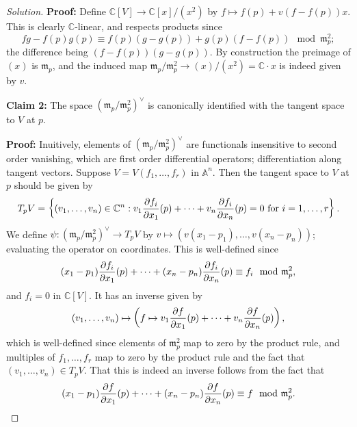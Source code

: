 \documentclass{article}
\theoremstyle{definition}
\newcommand{\m}{\mathfrak{m}}
\newcommand{\A}{\mathbb{A}}
\newcommand{\C}{\mathbb{C}}
\begin{document}
\begin{enumerate}
\begin{proof}[Solution]
            \textbf{Proof:}
            Define $\C[V]\to\C[x]/(x^2)$ by $f\mapsto f(p)+v(f-f(p))x$. This is
            clearly $\C$-linear, and respects products since
            \begin{equation*}
                fg-f(p)g(p) \equiv f(p)(g-g(p)) + g(p)(f-f(p)) \mod \m_p^2;
            \end{equation*}
            the difference being $(f-f(p))(g-g(p))$. By construction the
            preimage of $(x)$ is $\m_p$, and the induced map
            $\m_p/\m_p^2\to(x)/(x^2)=\C\cdot x$ is indeed given by $v$.

            \textbf{Claim 2:}
            The space $(\m_p/\m_p^2)^\vee$ is canonically identified with the
            tangent space to $V$ at $p$.

            \textbf{Proof:}
            Inuitively, elements of $(\m_p/\m_p^2)^\vee$ are functionals
            insensitive to second order vanishing, which are first order
            differential operators; differentiation along tangent vectors.
            Suppose $V=V(f_1,\ldots,f_r)$ in $\A^n$. Then the tangent space to
            $V$ at $p$ should be given by
            \begin{equation*}
                T_pV = \left\{(v_1,\ldots,v_n)\in\C^n
                    : v_1\pdv{f_i}{x_1}(p)+\cdots+v_n\pdv{f_i}{x_n}(p)=0
                    \text{ for $i=1,\ldots,r$}\right\}.
            \end{equation*}
            We define $\psi:(\m_p/\m_p^2)^\vee\to T_pV$ by
            $v\mapsto(v(x_1-p_1),\ldots,v(x_n-p_n))$; evaluating the operator on
            coordinates. This is well-defined since
            \begin{equation*}
                (x_1-p_1)\pdv{f_i}{x_1}(p) + \cdots + (x_n-p_n)\pdv{f_i}{x_n}(p)
                    \equiv f_i \mod \m_p^2,
            \end{equation*}
            and $f_i=0$ in $\C[V]$. It has an inverse given by
            \begin{equation*}
                (v_1,\ldots,v_n) \mapsto
                    \left(f\mapsto v_1\pdv{f}{x_1}(p)+\cdots
                        +v_n\pdv{f}{x_n}(p)\right),
            \end{equation*}
            which is well-defined since elements of $\m_p^2$ map to zero by the
            product rule, and multiples of $f_1,\ldots,f_r$ map to zero by the
            product rule and the fact that $(v_1,\ldots,v_n)\in T_pV$. That this
            is indeed an inverse follows from the fact that
            \begin{equation*}
                (x_1-p_1)\pdv{f}{x_1}(p) + \cdots + (x_n-p_n)\pdv{f}{x_n}(p)
                    \equiv f \mod \m_p^2.
            \end{equation*}
        \end{proof}


\end{enumerate}
\end{document}
